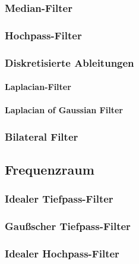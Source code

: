\documentclass[a4paper, 11pt, accentcolor = tud3b]{tudreport}
\begin{document}
				\subsubsection{Median-Filter} %

				\subsubsection{Hochpass-Filter} %

				\subsubsection{Diskretisierte Ableitungen} %

					\paragraph{Laplacian-Filter} %

					\paragraph{Laplacian of Gaussian Filter} %

				\subsubsection{Bilateral Filter} %

			\subsection{Frequenzraum} %

				\subsubsection{Idealer Tiefpass-Filter} %

				\subsubsection{Gaußscher Tiefpass-Filter} %

				\subsubsection{Idealer Hochpass-Filter} %
\end{document}
